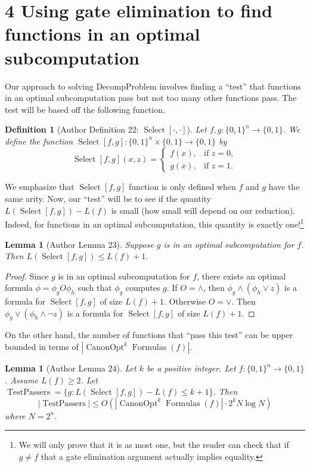 \documentclass[10pt,a4paper]{article}
\newtheorem{ntdefinition}[nttheorem]{Definition}
\newtheorem{ntlemma}[nttheorem]{Lemma}
\newcommand{\Canon}[1]{\operatorname{CanonOpt}^{#1}\!\operatorname{Formulas}}
\newcommand{\Select}{\operatorname{Select}}
\begin{document}
\section*{4 Using gate elimination to find functions in an optimal subcomputation}
Our approach to solving DecompProblem involves finding a ``test'' that functions in an optimal subcomputation pass but not too many other functions pass. The test will be based off the following function.
\setcounter{nttheorem}{21}
\begin{ntdefinition}[{Author Definition 22: $\Select[\cdot,\cdot]$}]
Let $f,g:\{0,1\}^n\to\{0,1\}$. We define the function $\Select[f,g]:\{0,1\}^n\times\{0,1\}\to\{0,1\}$ by
\[\Select[f,g](x,z)=\begin{cases}f(x),&\text{if }z=0,\\g(x),&\text{if }z=1.\end{cases}\]
\end{ntdefinition}
We emphasize that $\Select[f,g]$ function is only defined when $f$ and $g$ have the same arity.
Now, our ``test'' will be to see if the quantity $L(\Select[f,g])-L(f)$ is small (how small will depend on our reduction).
Indeed, for functions in an optimal subcomputation, this quantity is exactly one!\footnote{We will only prove that it is as most one, but the reader can check that if $g\ne f$ that a gate elimination argument actually implies equality.}
\begin{ntlemma}[Author Lemma 23]
Suppose $g$ is in an optimal subcomputation for $f$. Then $L(\Select[f,g])\leq L(f)+1$.
\end{ntlemma}
\begin{proof}
Since $g$ is in an optimal subcomputation for $f$, there exists an optimal formula $\phi=\phi_gO\phi_h$ such that $\phi_g$ computes $g$. If $O=\land$, then $\phi_g\land(\phi_h\lor z)$ is a formula for $\Select[f,g]$ of size $L(f)+1$. Otherwise $O=\lor$. Then $\phi_g\lor(\phi_h\land\neg z)$ is a formula for $\Select[f,g]$ of size $L(f)+1$.
\end{proof}
On the other hand, the number of functions that ``pass this test'' can be upper bounded in terms of $|\Canon{k}(f)|$.
\begin{ntlemma}[Author Lemma 24]
Let $k$ be a positive integer. Let $f:\{0,1\}^n\to\{0,1\}$. Assume $L(f)\geq 2$. Let $\operatorname{TestPassers}=\{g:L(\Select[f,g])-L(f)\leq k+1\}$. Then
\[|\operatorname{TestPassers}|\leq O(|\Canon{k}(f)|\cdot 2^kN\log N)\]
where $N=2^n$.
\end{ntlemma}
\end{document}
